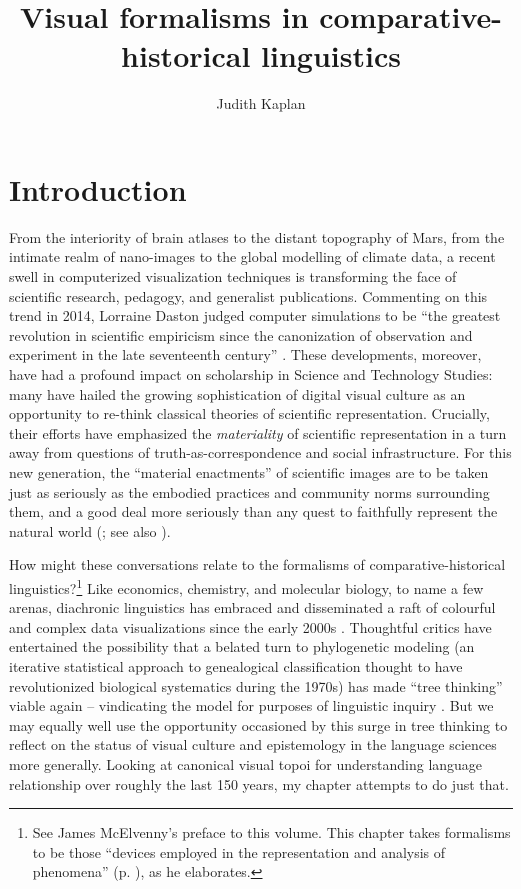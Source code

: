 \documentclass[output=paper]{langscibook}
\author{Judith Kaplan\affiliation{University of Pennsylvania}}
\title{Visual formalisms in comparative-historical linguistics}
\begin{document}
\maketitle

\section{Introduction}
\label{sec:kaplan:intro}

From the interiority of brain atlases to the distant topography of Mars, from the intimate realm of nano-images to the global modelling of climate data, a recent swell in  computerized visualization techniques is transforming the face of scientific research, pedagogy, and generalist publications. Commenting on this trend in 2014, Lorraine Daston judged computer simulations to be ``the greatest revolution in scientific empiricism since the canonization of observation and experiment in the late seventeenth century'' \citep[321]{Daston2014}. These developments, moreover, have had a profound impact on scholarship in Science and Technology Studies: many have hailed the growing sophistication of digital visual culture as an opportunity to re-think classical theories of scientific representation. Crucially, their efforts have emphasized the \emph{materiality} of scientific representation in a turn away from questions of truth-as-correspondence and social infrastructure. For this new generation, the ``material enactments'' of scientific images are to be taken just as seriously as the embodied practices and community norms surrounding them, and a good deal more seriously than any quest to faithfully represent the natural world (\citealt[3]{Coopmansetal2014}; see also \citealt{Kusukawa2016}).

How might these conversations relate to the formalisms of comparative-historical linguistics?\footnote{See James McElvenny's preface to this volume. This chapter takes formalisms to be those ``devices employed in the representation and analysis of phenomena'' (p. \pageref{p:pref:devices}), as he elaborates.} Like economics, chemistry, and molecular biology, to name a few arenas, diachronic linguistics has embraced and disseminated a raft of colourful and complex data visualizations since the early 2000s \citep[see, e.g., ][]{GrayDrummondGreenhill2009}. Thoughtful critics have entertained the possibility that a belated turn to phylogenetic modeling (an iterative statistical approach to genealogical classification thought to have revolutionized biological systematics during the 1970s) has made ``tree thinking'' viable again -- vindicating the model for purposes of linguistic inquiry \citep{Lopez2013}. But we may equally well use the opportunity occasioned by this surge in tree thinking to reflect on the status of visual culture and epistemology in the language sciences more generally. Looking at canonical visual topoi for understanding language relationship over roughly the last 150 years, my chapter attempts to do just that.
\end{document}
